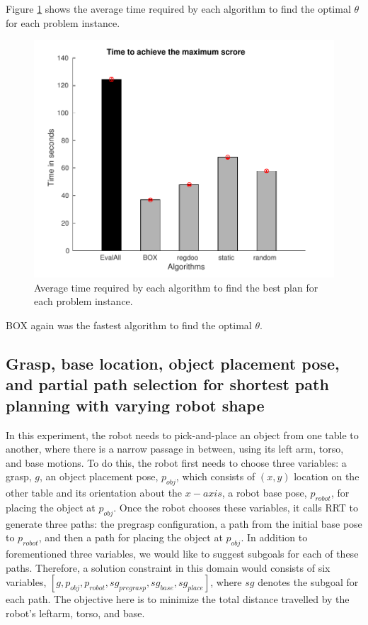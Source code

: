 Figure \ref{fig:opt_time_plot_pick_base} shows the average time required by each
algorithm to find the optimal $\theta$ for each problem instance.
\begin{figure}[htb]
\centering
\includegraphics[scale=0.5]{./figures/pick-place_opt_time_plot.pdf}
\caption{Average time required by each algorithm to find the best plan for each problem instance. }
\label{fig:opt_time_plot_pick_base}
\end{figure} 
BOX again was the fastest algorithm to find the optimal $\theta$.
\fi


\subsection{Grasp, base location, object placement pose, 
	    and partial path selection for shortest path planning
	    with varying robot shape
		}
In this experiment, the robot needs to pick-and-place an object
from one table to another, where there is a narrow passage
in between, using its left arm, torso, and base motions. 
To do this, the robot first needs to choose three variables:
a grasp, $g$, an object placement pose, $p_{obj}$, which consists of 
$(x,y)$ location on the other table and its orientation
about the $x-axis$, a robot base pose, $p_{robot}$, for placing the
object at $p_{obj}$. Once the robot chooses these variables,
it calls RRT to generate three paths: the pregrasp
configuration, a path from the initial base pose to $p_{robot}$,
and then a path for placing the object at $p_{obj}$. In addition
to forementioned three variables, we would like to suggest
subgoals for each of these paths. Therefore, a solution 
constraint in this domain would consists of six variables,
$[g,p_{obj},p_{robot},sg_{pregrasp},sg_{base},sg_{place}]$,
where $sg$ denotes the subgoal for each path.
The objective here is to minimize the total distance
travelled by the robot's leftarm, torso, and base.

